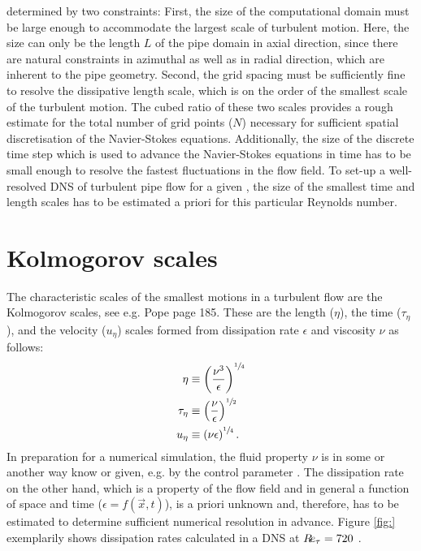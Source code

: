 \documentclass[a4paper, 11pt, twoside, DIV=12]{scrartcl}
\begin{document}
determined by two constraints: First, the size of the computational domain must
be large enough to accommodate the largest scale of turbulent motion. Here, the
size can only be the length $L$ of the pipe domain in axial direction, since
there are natural constraints in azimuthal as well as in radial direction, which
are inherent to the pipe geometry. Second, the grid spacing must be sufficiently
fine to resolve the dissipative length scale, which is on the order of the
smallest scale of the turbulent motion. The cubed ratio of these two scales
provides a rough estimate for the total number of grid points ($N$) necessary
for sufficient spatial discretisation of the Navier-Stokes equations.
Additionally, the size of the discrete time step which is used to advance the
Navier-Stokes equations in time has to be small enough to resolve the fastest
fluctuations in the flow field. To set-up a well-resolved DNS of turbulent pipe
flow for a given \Reynolds, the size of the smallest time and length scales has
to be estimated a priori for this particular Reynolds number.
%
%
%
\section{Kolmogorov scales}
The characteristic scales of the smallest motions in a turbulent flow are the
Kolmogorov scales, see e.g. Pope \cite{Pope2000} page 185. These are the length
($\eta$), the time ($\tau_{\eta}$), and the velocity ($u_{\eta}$) scales formed
from dissipation rate $\epsilon$ and viscosity $\nu$ as follows:
\begin{align}
\eta &\equiv \left(\frac{\nu^{3}}{\epsilon}\right)^{\sfrac{1}{4}}
\label{eq:kolmogorovLengthScale}\\
\tau_{\eta} &\equiv \left(\frac{\nu}{\epsilon}\right)^{\sfrac{1}{2}}
\label{eq:kolmogorovTimeScale}\\
u_{\eta} &\equiv \left(\nu\epsilon\right)^{\sfrac{1}{4}}\text{.}
\label{eq:kolmogorovVelocityScale}
\end{align}
In preparation for a numerical simulation, the fluid property $\nu$ is in some
or another way know or given, e.g. by the control parameter \Reynolds. The
dissipation rate on the other hand, which is a property of the flow field and in
general a function of space and time ($\epsilon=f(\vec{x},t)$), is a priori
unknown and, therefore, has to be estimated to determine sufficient numerical
resolution in advance. Figure \ref{fig:} exemplarily shows dissipation rates
calculated in a DNS at $R\!e_{\tau}=\num{720}$ \cite{}.
%
%
%
\end{document}
